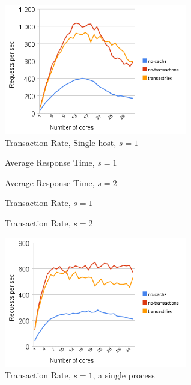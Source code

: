 \documentclass[preprint,natbib,11pt]{sigplanconf}
\begin{document}
\begin{figure}
 \begin{center}
  \includegraphics[width=8cm]{transaction-rate-single-host-1.png}
 \end{center}
 \caption{Transaction Rate, Single host, $s = 1$}
 \label{fig:transaction-rate-single-host-1}
\end{figure}
\begin{figure}
 \begin{center}
 \end{center}
 \caption{Average Response Time, $s = 1$}
 \label{fig:response-time-1}
\end{figure}
\begin{figure}
 \begin{center}
 \end{center}
 \caption{Average Response Time, $s = 2$}
 \label{fig:response-time-2}
\end{figure}
\begin{figure}
 \begin{center}
 \end{center}
 \caption{Transaction Rate, $s = 1$}
 \label{fig:transaction-rate-1}
\end{figure}
\begin{figure}
 \begin{center}
 \end{center}
 \caption{Transaction Rate, $s = 2$}
 \label{fig:transaction-rate-2}
\end{figure}
\begin{figure}
 \begin{center}
  \includegraphics[width=8cm]{transaction-rate-single-process.png}
 \end{center}
 \caption{Transaction Rate, $s = 1$, a single process}
 \label{fig:one-process-transaction-rate}
\end{figure}
\end{document}

